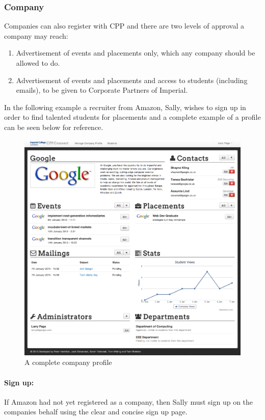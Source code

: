 \subsubsection{Company}
Companies can also register with CPP and there are two levels of approval a company may reach:
  \begin{enumerate}
    \item Advertisement of events and placements only, which any company should be allowed to do.
    \item Advertisement of events and placements and access to students (including emails), to be given to Corporate Partners of Imperial.
  \end{enumerate}
  In the following example a recruiter from Amazon, Sally, wishes to sign up in order to find talented students for placements and a complete example of a profile can be seen below for reference.
  \begin{figure}[H]\centering
  \includegraphics[scale=0.5]{images/user_experiences/company/complete_company_profile}
  \caption{A complete company profile}
  \end{figure}


  \paragraph{Sign up:}  
    If Amazon had not yet registered as a company, then Sally must sign up on the companies behalf using the clear and concise sign up page.

